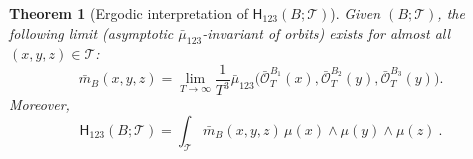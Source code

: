 \documentclass[12pt]{article}
\numberwithin{equation}{section}
\newtheorem{theorem}{Theorem}[section]
\begin{document}
\begin{theorem}[Ergodic interpretation of $\mathsf{H}_{123}(B;\mathcal{T})$]\label{th:ergodic-mu}
 Given $(B;\mathcal{T})$, the following limit (asymptotic $\bar{\mu}_{123}$-invariant of orbits) exists for  almost 
 all $(x,y,z)\in \mathcal{T}$:
\begin{equation}\label{eq:bar-m_B}
 \bar{m}_B(x,y,z)=\lim_{T\to\infty} \frac{1}{T^3}\bar{\mu}_{123}\bigl(\bar{\mathscr{O}}^{B_1}_T(x),\bar{\mathscr{O}}^{B_2}_T(y),\bar{\mathscr{O}}^{B_3}_T(y)\bigr).
\end{equation}
Moreover, 
\begin{equation}\label{eq:H_123-ergodic}
 \mathsf{H}_{123}(B;\mathcal{T})=\int_{\mathcal{T}} \bar{m}_B(x,y,z)\,\mu(x)\wedge\mu(y)\wedge\mu(z)\ .
\end{equation}
\end{theorem}
\end{document}
